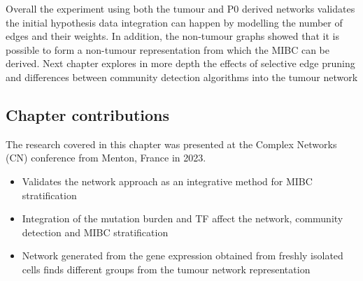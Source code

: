 Overall the experiment using both the tumour and P0 derived networks validates the initial hypothesis data integration can happen by modelling the number of edges and their weights. In addition, the non-tumour graphs showed that it is possible to form a non-tumour representation from which the MIBC can be derived. Next chapter explores in more depth the effects of selective edge pruning and differences between community detection algorithms into the tumour network

\subsection{Chapter contributions}

The research covered in this chapter was presented at the Complex Networks (CN) conference from Menton, France in 2023.

\begin{itemize}
    \item Validates the network approach as an integrative method for MIBC stratification
     \item Integration of the mutation burden and TF affect the network, community detection and MIBC stratification
     \item Network generated from the gene expression obtained from freshly isolated cells finds different groups from the tumour network representation
\end{itemize}
